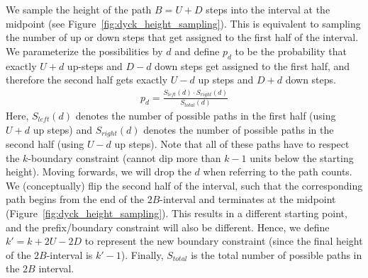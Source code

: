 We sample the height of the path $B = U+D$ steps into the interval at the midpoint (see Figure~\ref{fig:dyck_height_sampling}).
This is equivalent to sampling the number of up or down steps that get assigned to the first half of the interval.
We parameterize the possibilities by $d$ and define $p_d$ to be the probability that exactly $U+d$ up-steps and $D-d$ down steps
get assigned to the first half, and therefore the second half gets exactly $U-d$ up steps and $D+d$ down steps.
\begin{align}
\label{eq:height_sampling_probability}
p_d = \frac{S_{left}(d)\cdot S_{right}(d)}{S_{total}(d)}
\end{align}
Here, $S_{left}(d)$ denotes the number of possible paths in the first half (using $U+d$ up steps)
and $S_{right}(d)$ denotes the number of possible paths in the second half (using $U-d$ up steps).
Note that all of these paths have to respect the $k$-boundary constraint (cannot dip more than $k-1$ units below the starting height).
Moving forwards, we will drop the $d$ when referring to the path counts.
We (conceptually) flip the second half of the interval,
such that the corresponding path begins from the end of the $2B$-interval and terminates at the midpoint (Figure~\ref{fig:dyck_height_sampling}).
This results in a different starting point, and the prefix/boundary constraint will also be different.
Hence, we define $k' = k + 2U - 2D$  to represent the new boundary constraint (since the final height of the $2B$-interval is $k'-1$).
Finally, $S_{total}$ is the total number of possible paths in the $2B$ interval.

